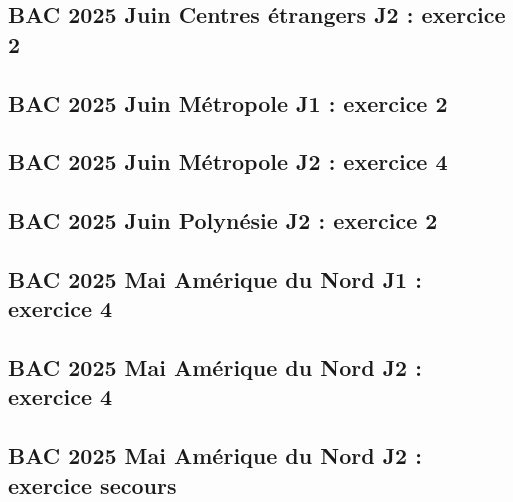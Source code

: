 \documentclass[lang=fr,edition=teacher,layout=sheet]{mxbook}
\begin{document}
\begingroup\endgroup
\par\bigskip
{}\subsection*{BAC 2025 Juin Centres étrangers J2 : exercice 2}
\begingroup\endgroup
\par\bigskip
{}\subsection*{BAC 2025 Juin Métropole J1 : exercice 2}
\begingroup\endgroup
\par\bigskip
{}\subsection*{BAC 2025 Juin Métropole J2 : exercice 4}
\begingroup\endgroup
\par\bigskip
{}\subsection*{BAC 2025 Juin Polynésie J2 : exercice 2}
\begingroup\endgroup
\par\bigskip
{}\subsection*{BAC 2025 Mai Amérique du Nord J1 : exercice 4}
\begingroup\endgroup
\par\bigskip
{}\subsection*{BAC 2025 Mai Amérique du Nord J2 : exercice 4}
\begingroup\endgroup
\par\bigskip
{}\subsection*{BAC 2025 Mai Amérique du Nord J2 : exercice secours}
\end{document}
